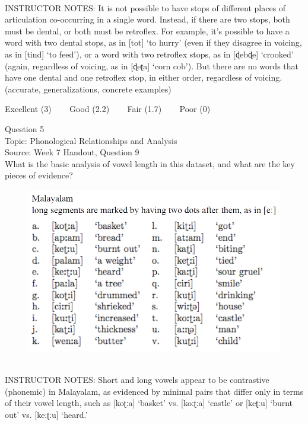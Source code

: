 \documentclass[12pt]{article}
\begin{document}
~\\
INSTRUCTOR NOTES: It is not possible to have stops of different places of articulation co-occurring in a single word. Instead, if there are two stops, both must be dental, or both must be retroflex. For example, it’s possible to have a word with two dental stops, as in [tot] ‘to hurry’ (even if they disagree in voicing, as in [tind] ‘to feed’), or a word with two retroflex stops, as in [ɖebɖe] ‘crooked’ (again, regardless of voicing, as in [ɖeʈa] ‘corn cob’). But there are no words that have one dental and one retroflex stop, in either order, regardless of voicing. (accurate, generalizations, concrete examples)


\vfill
Excellent (3) ~~~ Good (2.2) ~~~ Fair (1.7) ~~~ Poor (0)
\newpage

{\large Question 5}\\

Topic: Phonological Relationships and Analysis\\
Source: Week 7 Handout, Question 9\\

What is the basic analysis of vowel length in this dataset, and what are the key pieces of evidence?\\

\begin{figure}[H]
\includegraphics{../images/malayalam.png}
\end{figure}

~\\
INSTRUCTOR NOTES: Short and long vowels appear to be contrastive (phonemic) in Malayalam, as evidenced by minimal pairs that differ only in terms of their vowel length, such as [koʈːa] ‘basket’ vs. [koːʈːa] ‘castle’ or [keʈːu] ‘burnt out’ vs. [keːʈːu] ‘heard.’
\end{document}
